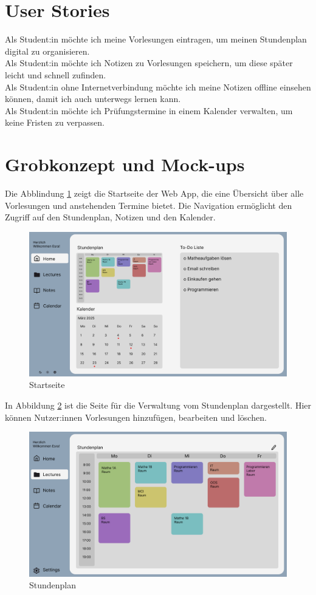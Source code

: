 \section{User Stories}
Als Student:in möchte ich meine Vorlesungen eintragen, um meinen Stundenplan digital zu organisieren.\\
Als Student:in möchte ich Notizen zu Vorlesungen speichern, um diese später leicht und schnell zufinden.\\
Als Student:in ohne Internetverbindung möchte ich meine Notizen offline einsehen können, damit ich auch unterwegs lernen kann.\\
Als Student:in möchte ich Prüfungstermine in einem Kalender verwalten, um keine Fristen zu verpassen.

\section{Grobkonzept und Mock-ups}
Die Abblindung \ref{fig:homepage} zeigt die Startseite der Web App, die eine Übersicht über alle Vorlesungen und anstehenden Termine bietet. Die Navigation ermöglicht den Zugriff auf den Stundenplan, Notizen und den Kalender.
\begin{figure}[H]
  \centering
  \includegraphics[width=1\textwidth]{./images/homepage.png}
  \caption{Startseite}
  \label{fig:homepage}
\end{figure}
In Abbildung \ref{fig:lectures} ist die Seite für die Verwaltung vom Stundenplan dargestellt. Hier können Nutzer:innen Vorlesungen hinzufügen, bearbeiten und löschen.
\begin{figure}[H]
  \centering
  \includegraphics[width=1\textwidth]{./images/lecturepage.png}
  \caption{Stundenplan}
  \label{fig:lectures}
\end{figure}
